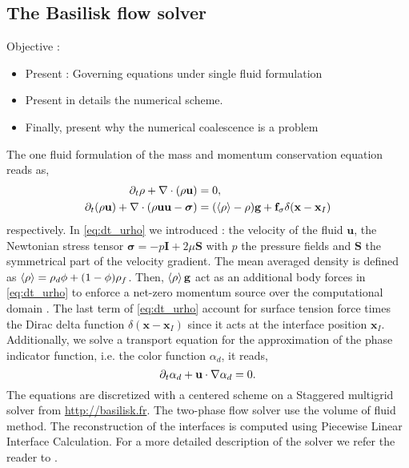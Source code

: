 


\subsection{The Basilisk flow solver}
Objective : 
\begin{itemize}
    \item Present : Governing equations under single fluid formulation 
    \item Present in details the numerical scheme. 
    \item Finally, present why the numerical coalescence is a problem
\end{itemize}


The one fluid formulation of the mass and momentum conservation equation reads as,
\begin{align}
    \label{eq:dt_rho}
    \partial_t \rho
    + \mathbf{\nabla}\cdot(\rho\textbf{u})
    &= 0, \\
    \partial_t (\rho \textbf{u})
    +\mathbf{\nabla} \cdot (\rho  \textbf{u} \textbf{u} - \bm{\sigma})
    &= 
    (\left<\rho\right> - \rho)\textbf{g}
    + \textbf{f}_\sigma\delta(\textbf{x} -\textbf{x}_I)
    \label{eq:dt_urho}
\end{align}
respectively.  
In \ref{eq:dt_urho} we introduced : the velocity of the fluid $\textbf{u}$,  the Newtonian stress  tensor $\bm{\sigma} = -p \textbf{I} + 2\mu \textbf{S}$ with $p$ the pressure fields and $\textbf{S}$ the symmetrical part of the velocity gradient.
The mean averaged density is defined as $\left<\rho\right> = \rho_d\phi + (1-\phi) \rho_f$. 
Then, $\left<\rho\right> \textbf{g}$ act as an additional body forces in \ref{eq:dt_urho}  to enforce a net-zero momentum source over the computational domain \citep{bunner2002dynamics} . 
The last term of \ref{eq:dt_urho} account for surface tension force  times the Dirac delta function $\delta(\textbf{x}-\textbf{x}_I)$ since it acts at the interface position $\textbf{x}_I$. 
Additionally, we solve a transport equation for the approximation of the phase indicator function, i.e. the color function $\alpha_d$, it reads,
\begin{equation}
    \partial_t \alpha_d + \textbf{u} \cdot \mathbf{\nabla} \alpha_d =0.
    \label{eq:dt_alpha}
\end{equation}
The equations are discretized with a centered scheme on a Staggered multigrid solver from \url{http://basilisk.fr}. 
The two-phase flow solver use the volume of fluid method. 
The reconstruction of the interfaces is computed using Piecewise Linear Interface Calculation. 
For a more detailed description of the solver we refer the reader to \citet{popinet2018numerical}. 

